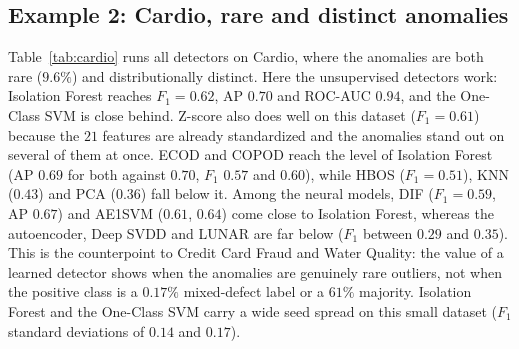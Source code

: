 \documentclass[conference]{IEEEtran}
\begin{document}
\subsection{Example 2: Cardio, rare and distinct anomalies}
\label{sec:cardio}
Table~\ref{tab:cardio} runs all detectors on Cardio, where the
anomalies are both rare ($9.6\%$) and distributionally distinct. Here the
unsupervised detectors work: Isolation Forest reaches $F_1 = 0.62$,
AP $0.70$ and ROC-AUC $0.94$, and the One-Class SVM is close behind.
Z-score also does well on this dataset ($F_1 = 0.61$) because the $21$
features are already standardized and the anomalies stand out on several
of them at once. ECOD and COPOD reach the level of Isolation Forest (AP $0.69$ for both
against $0.70$, $F_1$ $0.57$ and $0.60$), while HBOS ($F_1 = 0.51$), KNN ($0.43$) and PCA
($0.36$) fall below it. Among the neural models, DIF ($F_1 = 0.59$, AP $0.67$) and AE1SVM
($0.61$, $0.64$) come close to Isolation Forest, whereas the autoencoder, Deep SVDD and LUNAR
are far below ($F_1$ between $0.29$ and $0.35$). This is the counterpoint to Credit Card Fraud and Water
Quality: the value of a learned detector shows when the anomalies are
genuinely rare outliers, not when the positive class is a $0.17\%$
mixed-defect label or a $61\%$ majority. Isolation Forest and the
One-Class SVM carry a wide seed spread on this small dataset ($F_1$ standard
deviations of $0.14$ and $0.17$).
\end{document}
